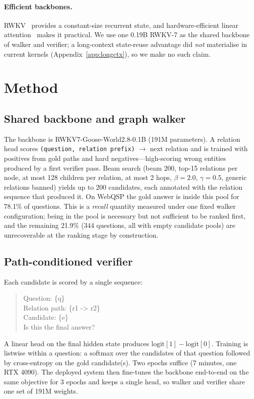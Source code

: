 \documentclass[sigconf,review,anonymous]{acmart}
\begin{document}
\paragraph{Efficient backbones.}
RWKV~\cite{peng2023rwkv,peng2025rwkv7} provides a constant-size recurrent state, and hardware-efficient linear attention~\cite{yang2024fla} makes it practical. We use one 0.19B RWKV-7 as the shared backbone of walker and verifier; a long-context state-reuse advantage did \emph{not} materialise in current kernels (Appendix~\ref{app:longctx}), so we make no such claim.

\section{Method}
\label{sec:method}

\subsection{Shared backbone and graph walker}
\label{sec:walker}
The backbone is RWKV7-Goose-World2.8-0.1B (191M parameters). A relation head scores \texttt{(question, relation prefix)} $\rightarrow$ next relation and is trained with positives from gold paths and hard negatives---high-scoring wrong entities produced by a first verifier pass. Beam search (beam 200, top-15 relations per node, at most 128 children per relation, at most 2 hops, $\beta=2.0$, $\gamma=0.5$, generic relations banned) yields up to 200 candidates, each annotated with the relation sequence that produced it. On WebQSP the gold answer is inside this pool for 78.1\% of questions. This is a \emph{recall} quantity measured under one fixed walker configuration; being in the pool is necessary but not sufficient to be ranked first, and the remaining 21.9\% (344 questions, all with empty candidate pools) are unrecoverable at the ranking stage by construction.

\subsection{Path-conditioned verifier}
\label{sec:verifier}
Each candidate is scored by a single sequence:
\begin{quote}\ttfamily\small
Question: \{q\}\\
Relation path: \{r1 -> r2\}\\
Candidate: \{e\}\\
Is this the final answer?
\end{quote}
A linear head on the final hidden state produces $\mathrm{logit}[1]-\mathrm{logit}[0]$. Training is listwise within a question: a softmax over the candidates of that question followed by cross-entropy on the gold candidate(s). Two epochs suffice (7 minutes, one RTX 4090). The deployed system then fine-tunes the backbone end-to-end on the same objective for 3 epochs and keeps a single head, so walker and verifier share one set of 191M weights.
\end{document}
